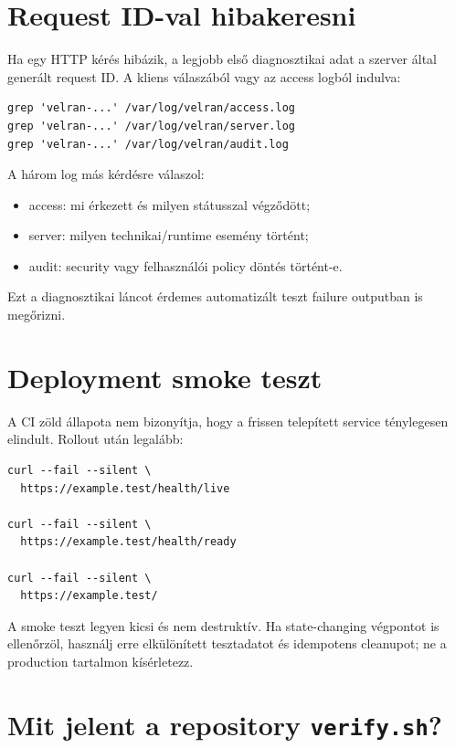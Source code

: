 \section{Request ID-val hibakeresni}

Ha egy HTTP kérés hibázik, a legjobb első diagnosztikai adat a szerver által generált request ID. A kliens válaszából vagy az access logból indulva:

\begin{lstlisting}
grep 'velran-...' /var/log/velran/access.log
grep 'velran-...' /var/log/velran/server.log
grep 'velran-...' /var/log/velran/audit.log
\end{lstlisting}

A három log más kérdésre válaszol:

\begin{itemize}
  \item access: mi érkezett és milyen státusszal végződött;
  \item server: milyen technikai/runtime esemény történt;
  \item audit: security vagy felhasználói policy döntés történt-e.
\end{itemize}

Ezt a diagnosztikai láncot érdemes automatizált teszt failure outputban is megőrizni.

\section{Deployment smoke teszt}

A CI zöld állapota nem bizonyítja, hogy a frissen telepített service ténylegesen elindult. Rollout után legalább:

\begin{lstlisting}
curl --fail --silent \
  https://example.test/health/live

curl --fail --silent \
  https://example.test/health/ready

curl --fail --silent \
  https://example.test/
\end{lstlisting}

A smoke teszt legyen kicsi és nem destruktív. Ha state-changing végpontot is ellenőrzöl, használj erre elkülönített tesztadatot és idempotens cleanupot; ne a production tartalmon kísérletezz.

\section{Mit jelent a repository \texttt{verify.sh}?}

